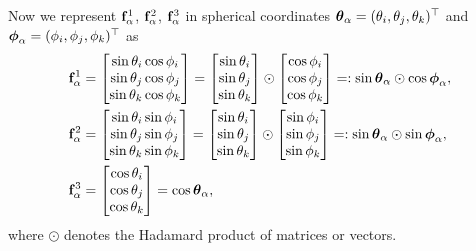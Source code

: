 \documentclass[11pt,a4paper]{article}
\begin{document}
Now we represent $\mathbf{f}_\alpha^1$, $\mathbf{f}_\alpha^2$, $\mathbf{f}_\alpha^3$ in spherical coordinates ${\boldsymbol{\theta}}_\alpha = (\theta_i, \theta_j, \theta_k)^\top$ and ${\boldsymbol{\phi}}_\alpha = (\phi_i, \phi_j, \phi_k)^\top$ as
\begin{align*}
\mathbf{f}_\alpha^1 &= 
\begin{bmatrix}
\sin \theta_i \cos \phi_i \\
\sin \theta_j \cos \phi_j \\
\sin \theta_k \cos \phi_k \\
\end{bmatrix} 
= \begin{bmatrix}
\sin \theta_i \\
\sin \theta_j \\
\sin \theta_k \\
\end{bmatrix}
\odot
\begin{bmatrix}
\cos \phi_i \\
\cos \phi_j \\
\cos \phi_k \\
\end{bmatrix}
=: \sin{\boldsymbol{\theta}}_\alpha \odot \cos{\boldsymbol{\phi}}_\alpha,\\
\mathbf{f}_\alpha^2 &= 
\begin{bmatrix}
\sin \theta_i \sin \phi_i \\
\sin \theta_j \sin \phi_j \\
\sin \theta_k \sin \phi_k \\
\end{bmatrix} 
= \begin{bmatrix}
\sin \theta_i \\
\sin \theta_j \\
\sin \theta_k \\
\end{bmatrix}
\odot
\begin{bmatrix}
\sin \phi_i \\
\sin \phi_j \\
\sin \phi_k \\
\end{bmatrix}
=: \sin{\boldsymbol{\theta}}_\alpha \odot \sin{\boldsymbol{\phi}}_\alpha,\\
\mathbf{f}_\alpha^3 &= 
\begin{bmatrix}
\cos \theta_i \\ 
\cos \theta_j \\ 
\cos \theta_k 
\end{bmatrix} = \cos {\boldsymbol{\theta}}_\alpha,
\end{align*}
where $\odot$ denotes the Hadamard product of matrices or vectors. 
\end{document}
